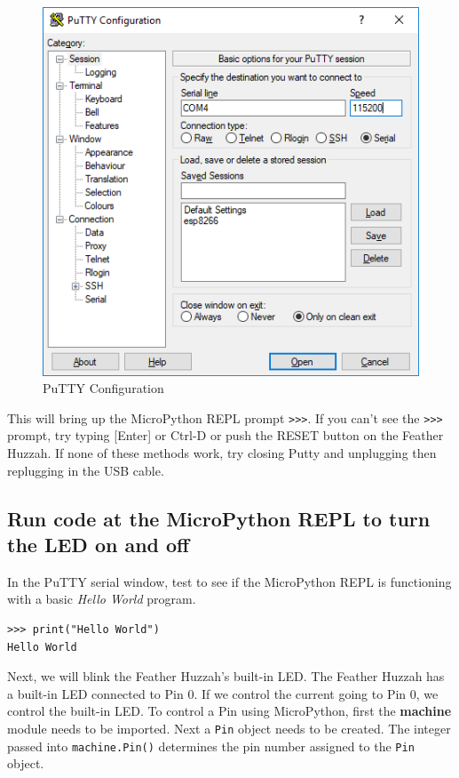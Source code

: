 \documentclass{book}
\makeatletter
\def\maxwidth{\ifdim\Gin@nat@width>\linewidth\linewidth
    \else\Gin@nat@width\fi}
\let\Oldincludegraphics\includegraphics
\renewcommand{\includegraphics}[1]{\Oldincludegraphics[width=.8\maxwidth]{#1}}
\makeatother
\begin{document}
\begin{figure}
\centering
\includegraphics{images/putty_config.PNG}
\caption{PuTTY Configuration}
\end{figure}

This will bring up the MicroPython REPL prompt \lstinline!>>>!. If you
can't see the \lstinline!>>>! prompt, try typing {[}Enter{]} or Ctrl-D
or push the RESET button on the Feather Huzzah. If none of these methods
work, try closing Putty and unplugging then replugging in the USB cable.

    \subsection{Run code at the MicroPython REPL to turn the LED on and
off}\label{run-code-at-the-micropython-repl-to-turn-the-led-on-and-off}

    In the PuTTY serial window, test to see if the MicroPython REPL is
functioning with a basic \emph{Hello World} program.

\begin{lstlisting}
>>> print("Hello World")
Hello World
\end{lstlisting}

Next, we will blink the Feather Huzzah's built-in LED. The Feather
Huzzah has a built-in LED connected to Pin 0. If we control the current
going to Pin 0, we control the built-in LED. To control a Pin using
MicroPython, first the \textbf{machine} module needs to be imported.
Next a \lstinline!Pin! object needs to be created. The integer passed
into \lstinline!machine.Pin()! determines the pin number assigned to the
\lstinline!Pin! object.
\end{document}
